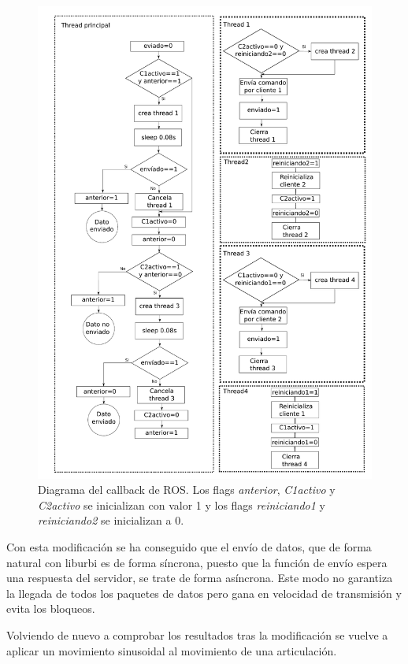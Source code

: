 \documentclass[12pt,a4paper,final,twoside]{book}
\begin{document}
\begin{figure}[H]
	\centering
    \includegraphics[scale=0.7]{images/esquemaCall.pdf}
	 \caption{Diagrama del callback de ROS. Los flags \textit{anterior}, \textit{C1activo} y \textit{C2activo}  se inicializan con valor 1 y los flags \textit{reiniciando1} y \textit{reiniciando2} se inicializan a 0.}
  \label{fig:Call}
\end{figure}

Con esta modificación se ha conseguido que el envío de datos, que de forma natural con liburbi es de forma síncrona, puesto que la función de envío espera una respuesta del servidor, se trate de forma asíncrona. Este modo no garantiza la llegada de todos los paquetes de datos pero gana en velocidad de transmisión y evita los bloqueos.

Volviendo de nuevo a comprobar los resultados tras la modificación se vuelve a aplicar un movimiento sinusoidal al movimiento de una articulación.
\end{document}
